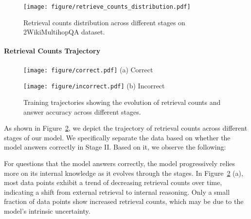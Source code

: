 \begin{figure}
    \centering
    \texttt{[image: figure/retrieve\_counts\_distribution.pdf]}
    \caption{Retrieval counts distribution across different stages on 2WikiMultihopQA dataset.}
    \label{fig:retrieve-counts}
\end{figure}


\paragraph{Retrieval Counts Trajectory}



\begin{figure}[htbp]
    \centering
    \begin{minipage}[b]{0.48\linewidth}
        \centering
        \texttt{[image: figure/correct.pdf]}
        (a) Correct
    \end{minipage}
    \hfill
    \begin{minipage}[b]{0.48\linewidth}
        \centering
        \texttt{[image: figure/incorrect.pdf]}
        (b) Incorrect
    \end{minipage}
    \caption{Training trajectories showing the evolution of retrieval counts and answer accuracy across different stages.}
    \label{fig:trajectory}
\end{figure}


As shown in Figure~\ref{fig:trajectory}, we depict the trajectory of retrieval counts across different stages of our model. We specifically separate the data based on whether the model answers correctly in Stage II. Based on it, we observe the following:

For questions that the model answers correctly, the model progressively relies more on its internal knowledge as it evolves through the stages. In Figure~\ref{fig:trajectory} (a), most data points exhibit a trend of decreasing retrieval counts over time, indicating a shift from external retrieval to internal reasoning. Only a small fraction of data points show increased retrieval counts, which may be due to the model's intrinsic uncertainty.

